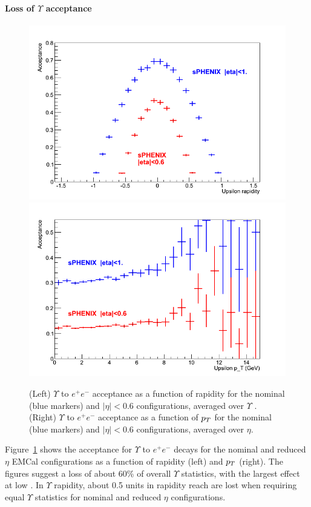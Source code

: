 \paragraph{Loss of $\Upsilon$ acceptance}
\begin{figure}[hbt]
  \centering
  \includegraphics[width=0.4\linewidth]{figs/upsilon_rate_y}
  \hspace{0.1\linewidth}
  \includegraphics[width=0.4\linewidth]{figs/upsilon_rate_pT}
  \caption{(Left)
  $\Upsilon$ to $e^+ e^-$ acceptance as a function of rapidity for the nominal (blue markers) and $| \eta | < 0.6$ configurations,
  averaged over $\Upsilon$ \pt. 
  (Right) $\Upsilon$ to $e^+ e^-$ acceptance as a function of $\mbox{${p_T}$}$ for the nominal (blue markers) and $| \eta | < 0.6$ 
  configurations, averaged over $\eta$.}
  \label{fig:upsilon_rate}
\end{figure}

Figure~\ref{fig:upsilon_rate} shows the acceptance for $\Upsilon$ to $e^+ e^-$ decays for the nominal and reduced $\eta$ EMCal
configurations as a function of rapidity (left) and $\mbox{${p_T}$}$ (right). The figures suggest a loss of about 60\% of overall 
$\Upsilon$ statistics, with the largest effect at low \pt. In $\Upsilon$ rapidity, about 0.5 units in rapidity reach are 
lost when requiring equal $\Upsilon$ statistics for nominal and reduced $\eta$ configurations.

